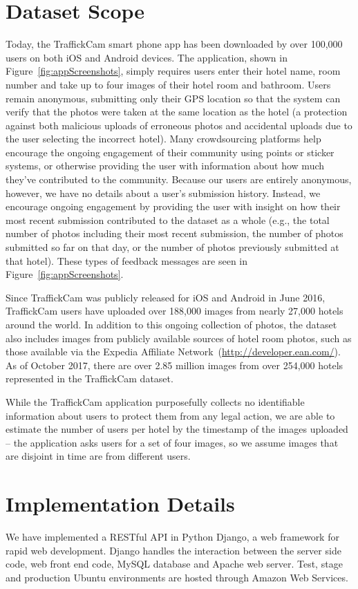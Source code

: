 \section{Dataset Scope}
Today, the TraffickCam smart phone app has been downloaded by over 100,000 users on both iOS and Android devices. The application, shown in Figure~\ref{fig:appScreenshots}, simply requires users enter their hotel name, room number and take up to four images of their hotel room and bathroom. Users remain anonymous, submitting only their GPS location so that the system can verify that the photos were taken at the same location as the hotel (a protection against both malicious uploads of erroneous photos and accidental uploads due to the user selecting the incorrect hotel). Many crowdsourcing platforms help encourage the ongoing engagement of their community using points or sticker systems, or otherwise providing the user with information about how much they've contributed to the community. Because our users are entirely anonymous, however, we have no details about a user's submission history. Instead, we encourage ongoing engagement by providing the user with insight on how their most recent submission contributed to the dataset as a whole (e.g., the total number of photos including their most recent submission, the number of photos submitted so far on that day, or the number of photos previously submitted at that hotel). These types of feedback messages are seen in Figure~\ref{fig:appScreenshots}.

Since TraffickCam was publicly released for iOS and Android in June 2016, TraffickCam users have uploaded over 188,000 images from nearly 27,000 hotels around the world. In addition to this ongoing collection of photos, the dataset also includes images from publicly available sources of hotel room photos, such as those available via the Expedia Affiliate Network~(\url{http://developer.ean.com/}). As of October 2017, there are over 2.85 million images from over 254,000 hotels represented in the TraffickCam dataset.

While the TraffickCam application purposefully collects no identifiable information about users to protect them from any legal action, we are able to estimate the number of users per hotel by the timestamp of the images uploaded -- the application asks users for a set of four images, so we assume images that are disjoint in time are from different users.

\section{Implementation Details}
We have implemented a RESTful API in Python Django, a web framework for rapid web development. Django handles the interaction between the server side code, web front end code, MySQL database and Apache web server. Test, stage and production Ubuntu environments are hosted through Amazon Web Services.

